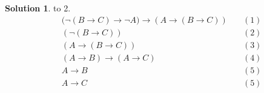 \documentclass[12pt, a4paper]{ctexart} %
\theoremstyle{plain}
\theoremstyle{definition}
\newtheorem*{solution}{Solution}
\begin{document}
\begin{solution} to 2.
    \begin{align*}
         &\ \big( \neg \left(B \to C\right) \to \neg A \big) \to \left(A \to \left(B \to C\right) \right)&\quad \left(1\right)\tag{A3}\\
         &\ \left( \neg \left(B \to C\right) \right)                                                     &\quad \left(2\right)        \\
         &\ \left(A \to \left(B \to C\right) \right)                                                     &\quad \left(3\right)    \tag{(1) (2) rmp}\\
         &\ \left(A \to B\right) \to \left(A \to C\right)                                                &\quad \left(4\right)\tag{A2, thm 8, rmp} \\
         &\ A \to B                                                                                      &\quad \left(5\right)\\
         &\ A \to C                                                                                      &\quad \left(5\right)\tag{(4) (5) rmp}
    \end{align*}
\end{solution}
\end{document}
